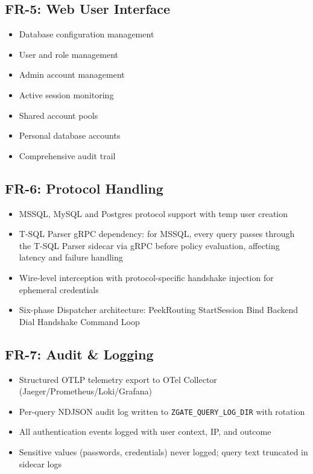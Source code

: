 \subsection{FR-5: Web User Interface}
\begin{itemize}
    \item Database configuration management
    \item User and role management
    \item Admin account management
    \item Active session monitoring
    \item Shared account pools
    \item Personal database accounts
    \item Comprehensive audit trail
\end{itemize}

\subsection{FR-6: Protocol Handling}
\begin{itemize}
    \item MSSQL, MySQL and Postgres protocol support with temp user creation
    \item T-SQL Parser gRPC dependency: for MSSQL, every query passes through the T-SQL Parser sidecar via gRPC before policy evaluation, affecting latency and failure handling
    \item Wire-level interception with protocol-specific handshake injection for ephemeral credentials
    \item Six-phase Dispatcher architecture: PeekRouting \textrightarrow{} StartSession \textrightarrow{} Bind \textrightarrow{} Backend Dial \textrightarrow{} Handshake \textrightarrow{} Command Loop
\end{itemize}

\subsection{FR-7: Audit \& Logging}
\begin{itemize}
    \item Structured OTLP telemetry export to OTel Collector (Jaeger/Prometheus/Loki/Grafana)
    \item Per-query NDJSON audit log written to \texttt{ZGATE\_QUERY\_LOG\_DIR} with rotation
    \item All authentication events logged with user context, IP, and outcome
    \item Sensitive values (passwords, credentials) never logged; query text truncated in sidecar logs
\end{itemize}

